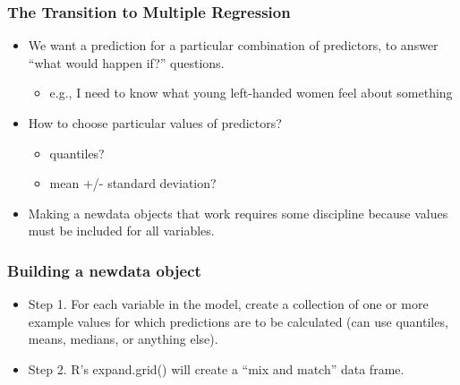 \documentclass[10pt,english]{beamer}
\begin{document}
\begin{frame}[containsverbatim]
\frametitle{The Transition to Multiple Regression}
\begin{itemize}
\item We want a prediction for a particular combination of predictors, to
answer ``what would happen if?'' questions.

\begin{itemize}
\item e.g., I need to know what young left-handed women feel about something
\end{itemize}
\item How to choose particular values of predictors? 

\begin{itemize}
\item quantiles?
\item mean +/- standard deviation?
\end{itemize}
\item Making a newdata objects that work requires some discipline because
values must be included for all variables.
\end{itemize}
\end{frame}

\begin{frame}
\frametitle{Building a newdata object}
\begin{itemize}
\item Step 1. For each variable in the model, create a collection of one
or more example values for which predictions are to be calculated
(can use quantiles, means, medians, or anything else).
\item Step 2. R's expand.grid() will create a ``mix and match'' data frame. 




\end{itemize}
\end{frame}
\end{document}
